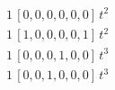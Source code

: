 \begin{align*}
1\,[0,0,0,0,0,0]\,t^{2} \\
1\,[1,0,0,0,0,1]\,t^{2} \\
1\,[0,0,0,1,0,0]\,t^{3} \\
1\,[0,0,1,0,0,0]\,t^{3}
\end{align*}
